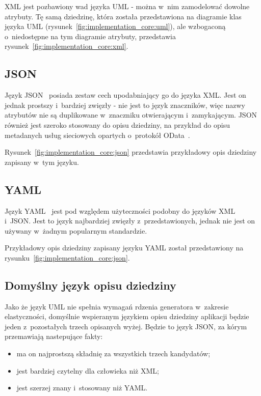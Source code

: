 XML jest pozbawiony wad języka UML - można w~nim zamodelować dowolne atrybuty.
Tę samą dziedzinę, która została przedstawiona na diagramie klas języka UML (rysunek~\ref{fig:implementation_core:uml}), ale wzbogaconą o~niedostępne na tym diagramie atrybuty, przedstawia rysunek~\ref{fig:implementation_core:xml}.




\subsection{JSON}

Język JSON~\cite{json} posiada zestaw cech upodabniający go do języka XML.
Jest on jednak prostszy i~bardziej zwięzły - nie jest to język znaczników, więc nazwy atrybutów nie są duplikowane w~znaczniku otwierającym i~zamykającym.
JSON również jest szeroko stosowany do opisu dziedziny, na przykład do opisu metadanych usług sieciowych opartych o~protokół OData~\cite{odata}.

Rysunek~\ref{fig:implementation_core:json} przedstawia przykładowy opis dziedziny zapisany w~tym języku.




\subsection{YAML}

Język YAML~\cite{yaml} jest pod względem użyteczności podobny do języków XML i~JSON.
Jest to język najbardziej zwięzły z~przedstawionych, jednak nie jest on używany w~żadnym popularnym standardzie.

Przykładowy opis dziedziny zapisany języku YAML został przedstawiony na rysunku~\ref{fig:implementation_core:json}.




\subsection{Domyślny język opisu dziedziny}

Jako że język UML nie spełnia wymagań rdzenia generatora w~zakresie elastyczności, domyślnie wspieranym językiem opisu dziedziny aplikacji będzie jeden z~pozostałych trzech opisanych wyżej.
Będzie to język JSON, za kórym przemawiają nastepujące fakty:

\begin{itemize}
 \item ma on najprostszą składnię za wszystkich trzech kandydatów;
 \item jest bardziej czytelny dla człowieka niż XML;
 \item jest szerzej znany i~stosowany niż YAML.
\end{itemize}

